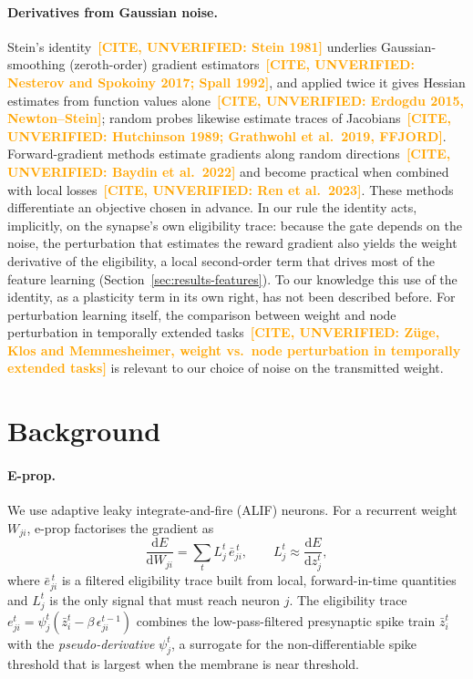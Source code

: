 \documentclass[10pt,twocolumn]{article}
\newcommand{\unverified}[1]{\textcolor{orange}{\bfseries[CITE, UNVERIFIED: #1]}}
\begin{document}
\paragraph{Derivatives from Gaussian noise.}
Stein's identity~\unverified{Stein 1981} underlies Gaussian-smoothing
(zeroth-order) gradient estimators~\unverified{Nesterov and Spokoiny 2017;
Spall 1992}, and applied twice it gives Hessian estimates from function values
alone~\unverified{Erdogdu 2015, Newton--Stein}; random probes likewise estimate
traces of Jacobians~\unverified{Hutchinson 1989; Grathwohl et al.\ 2019, FFJORD}.
Forward-gradient methods estimate gradients along random
directions~\unverified{Baydin et al.\ 2022} and become practical when combined
with local losses~\unverified{Ren et al.\ 2023}. These methods differentiate an
objective chosen in advance. In our rule the identity acts, implicitly, on the
synapse's own eligibility trace: because the gate depends on the noise, the
perturbation that estimates the reward gradient also yields the weight derivative
of the eligibility, a local second-order term that drives most of the feature
learning (Section~\ref{sec:results-features}). To our knowledge this use of the
identity, as a plasticity term in its own right, has not been described before.
For perturbation learning itself, the comparison between weight and node
perturbation in temporally extended tasks~\unverified{Z\"uge, Klos and
Memmesheimer, weight vs.\ node perturbation in temporally extended tasks} is
relevant to our choice of noise on the transmitted weight.

\section{Background}
\label{sec:background}

\paragraph{E-prop.}
We use adaptive leaky integrate-and-fire (ALIF) neurons. For a recurrent weight
$W_{ji}$, e-prop factorises the gradient as
\begin{equation}
\frac{\mathrm{d}E}{\mathrm{d}W_{ji}} = \sum_t L^t_j\,\bar{e}^{\,t}_{ji},
\qquad L^t_j \approx \frac{\mathrm{d}E}{\mathrm{d}z^t_j},
\label{eq:eprop-factorisation}
\end{equation}
where $\bar e^{\,t}_{ji}$ is a filtered eligibility trace built from local,
forward-in-time quantities and $L^t_j$ is the only signal that must reach
neuron $j$. The eligibility trace $e^t_{ji}=\psi^t_j(\bar z^t_i-\beta\,
\epsilon^{t-1}_{ji})$ combines the low-pass-filtered presynaptic spike train
$\bar z^t_i$ with the \emph{pseudo-derivative} $\psi^t_j$, a surrogate for the
non-differentiable spike threshold that is largest when the membrane is near
threshold.
\end{document}
